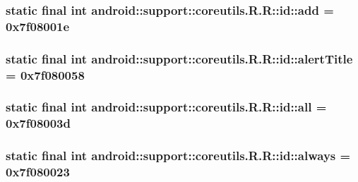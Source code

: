 \hypertarget{classandroid_1_1support_1_1coreutils_1_1_r_1_1id_fead2f1812dc5fe5f96a566342a57ba0}{
\subsubsection[{add}]{\setlength{\rightskip}{0pt plus 5cm}static final int android::support::coreutils.R.R::id::add = 0x7f08001e}}
\label{classandroid_1_1support_1_1coreutils_1_1_r_1_1id_fead2f1812dc5fe5f96a566342a57ba0}


\hypertarget{classandroid_1_1support_1_1coreutils_1_1_r_1_1id_13ef338005eedf5f07f12e83ab9dd81e}{
\subsubsection[{alertTitle}]{\setlength{\rightskip}{0pt plus 5cm}static final int android::support::coreutils.R.R::id::alertTitle = 0x7f080058}}
\label{classandroid_1_1support_1_1coreutils_1_1_r_1_1id_13ef338005eedf5f07f12e83ab9dd81e}


\hypertarget{classandroid_1_1support_1_1coreutils_1_1_r_1_1id_de825fa1b5932c63ed250f7ad8fbe342}{
\subsubsection[{all}]{\setlength{\rightskip}{0pt plus 5cm}static final int android::support::coreutils.R.R::id::all = 0x7f08003d}}
\label{classandroid_1_1support_1_1coreutils_1_1_r_1_1id_de825fa1b5932c63ed250f7ad8fbe342}


\hypertarget{classandroid_1_1support_1_1coreutils_1_1_r_1_1id_20aa4092f5640111bad520d0927a9b53}{
\subsubsection[{always}]{\setlength{\rightskip}{0pt plus 5cm}static final int android::support::coreutils.R.R::id::always = 0x7f080023}}
\label{classandroid_1_1support_1_1coreutils_1_1_r_1_1id_20aa4092f5640111bad520d0927a9b53}


